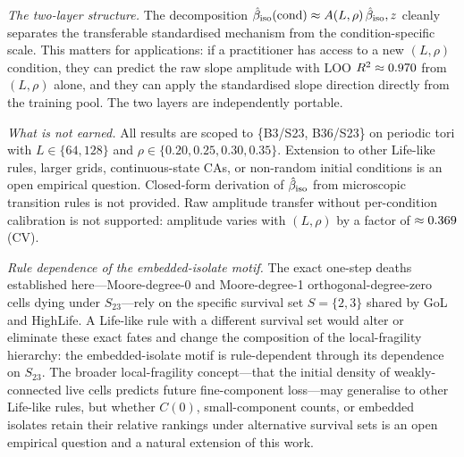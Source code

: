 \documentclass[aip,cha,preprint,nofootinbib]{revtex4-2}
\newcommand{\iso}{{\rm iso}}
\newcommand{\biso}{\hat{\beta}_{\iso}}
\begin{document}
\textit{The two-layer structure.}
The decomposition $\biso(\text{cond}) \approx A(L,\rho)\,\biso,z$ cleanly
separates the transferable standardised mechanism from the condition-specific scale.
This matters for applications: if a practitioner has access to a new
$(L,\rho)$ condition, they can predict the raw slope amplitude with
LOO $R^2 \approx 0.970$ from $(L,\rho)$ alone, and they can
apply the standardised slope direction directly from the training pool.
The two layers are independently portable.

\textit{What is not earned.}
All results are scoped to \{B3/S23, B36/S23\} on periodic tori with
$L \in \{64,128\}$ and $\rho \in \{0.20, 0.25, 0.30, 0.35\}$.
Extension to other Life-like rules, larger grids,
continuous-state CAs, or non-random initial conditions is an open
empirical question.
Closed-form derivation of $\biso$ from microscopic transition rules
is not provided.
Raw amplitude transfer without per-condition calibration is not
supported: amplitude varies with $(L,\rho)$ by a factor of
$\approx 0.369$ (CV).

\textit{Rule dependence of the embedded-isolate motif.}
The exact one-step deaths established here---Moore-degree-0 and
Moore-degree-1 orthogonal-degree-zero cells dying under $S_{23}$---rely
on the specific survival set $S=\{2,3\}$ shared by GoL and HighLife.
A Life-like rule with a different survival set would alter or eliminate
these exact fates and change the composition of the local-fragility
hierarchy: the embedded-isolate motif is rule-dependent through its
dependence on $S_{23}$.
The broader local-fragility concept---that the initial density of
weakly-connected live cells predicts future fine-component loss---may
generalise to other Life-like rules, but whether $C(0)$, small-component
counts, or embedded isolates retain their relative rankings under
alternative survival sets is an open empirical question and a natural
extension of this work.
\end{document}
